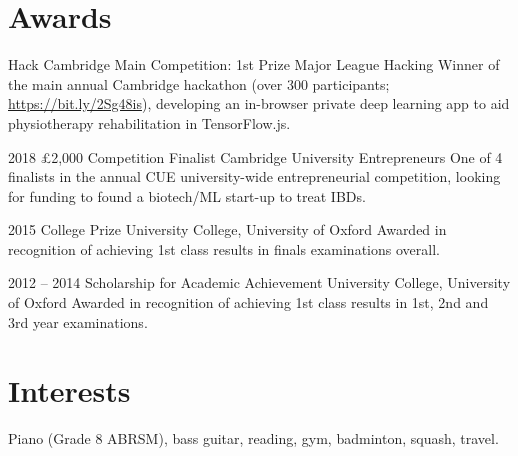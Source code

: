 \documentclass[]{friggeri-cv} %
\begin{document}
\pagebreak
\section{Awards}

\begin{entrylist}
	
    {Hack Cambridge Main Competition: 1st Prize}
    {Major League Hacking}
    {Winner of the main annual Cambridge hackathon (over 300 participants; \url{https://bit.ly/2Sg48is}), developing an in-browser private deep learning app to aid physiotherapy rehabilitation in TensorFlow.js.}
	
    \entrysmall
    {2018}
    {£2,000 Competition Finalist}
    {Cambridge University Entrepreneurs}
    {One of 4 finalists in the annual CUE university-wide entrepreneurial competition, looking for
    funding to found a biotech/ML start-up to treat IBDs.}
    
	\entrysmall
	{2015}
	{College Prize}
	{University College, University of Oxford}
	{Awarded in recognition of achieving 1st class results in finals examinations overall.}
    	
	\entrysmall
	{2012 -- 2014}
	{Scholarship {\normalfont for Academic Achievement}}
	{University College, University of Oxford}
	{Awarded in recognition of achieving 1st class results in 1st, 2nd and 3rd year examinations.}

	
	
\end{entrylist}


\section{Interests}

Piano (Grade 8 ABRSM), bass guitar, reading, gym, badminton, squash, travel.


\iffalse
\end{document}
